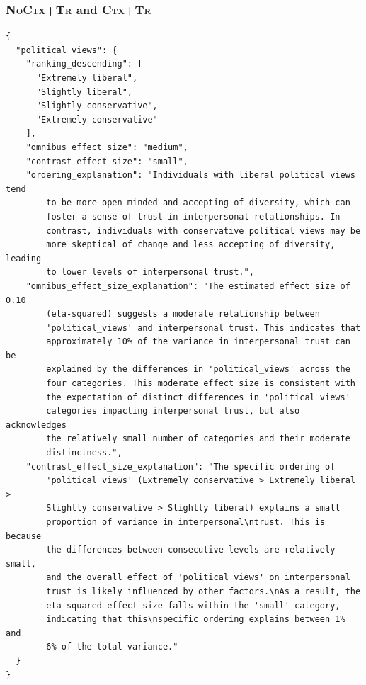 \documentclass{article} %
\begin{document}
\begin{appendices}
\subsubsection{\textsc{NoCtx+Tr} and \textsc{Ctx+Tr}}
\label{app:population-belief-samples-noctx-tr}
\begin{lstlisting}[frame=single,basicstyle=\ttfamily\small,showspaces=false]
{
  "political_views": {
    "ranking_descending": [
      "Extremely liberal",
      "Slightly liberal",
      "Slightly conservative",
      "Extremely conservative"
    ],
    "omnibus_effect_size": "medium",
    "contrast_effect_size": "small",
    "ordering_explanation": "Individuals with liberal political views tend
        to be more open-minded and accepting of diversity, which can
        foster a sense of trust in interpersonal relationships. In
        contrast, individuals with conservative political views may be
        more skeptical of change and less accepting of diversity, leading
        to lower levels of interpersonal trust.",
    "omnibus_effect_size_explanation": "The estimated effect size of 0.10
        (eta-squared) suggests a moderate relationship between
        'political_views' and interpersonal trust. This indicates that
        approximately 10% of the variance in interpersonal trust can be
        explained by the differences in 'political_views' across the
        four categories. This moderate effect size is consistent with
        the expectation of distinct differences in 'political_views'
        categories impacting interpersonal trust, but also acknowledges
        the relatively small number of categories and their moderate
        distinctness.",
    "contrast_effect_size_explanation": "The specific ordering of
        'political_views' (Extremely conservative > Extremely liberal >
        Slightly conservative > Slightly liberal) explains a small
        proportion of variance in interpersonal\ntrust. This is because
        the differences between consecutive levels are relatively small,
        and the overall effect of 'political_views' on interpersonal
        trust is likely influenced by other factors.\nAs a result, the
        eta squared effect size falls within the 'small' category,
        indicating that this\nspecific ordering explains between 1% and
        6% of the total variance."
  }
}
\end{lstlisting}




\end{appendices}
\end{document}

